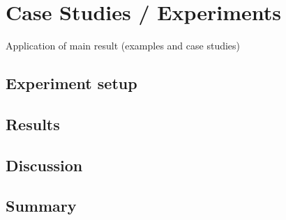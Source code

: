 \chapter{Case Studies / Experiments}
  Application of main result (examples and case studies)
\section{Experiment setup}
  \section{Results}
  \section{Discussion}
\section{Summary}
